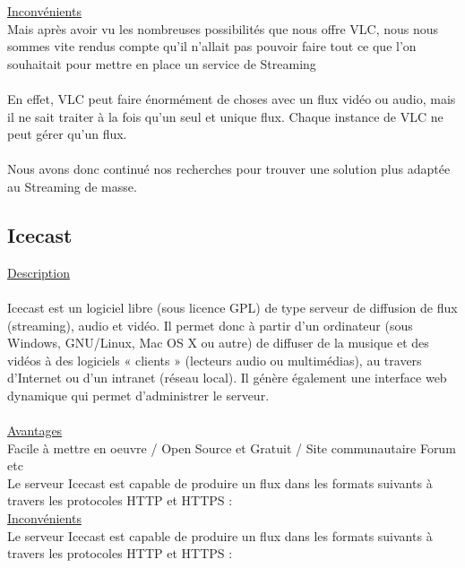 \documentclass{report}
\begin{document}
    \underline{Inconvénients}\\
    
    Mais après avoir vu les nombreuses possibilités que nous offre VLC, nous nous sommes vite rendus compte qu’il n’allait pas pouvoir faire tout ce que l’on souhaitait pour mettre en place un service de Streaming
    \\
    \\
    En effet, VLC peut faire énormément de choses avec un flux vidéo ou audio, mais il ne sait traiter à la fois qu’un seul et unique flux. Chaque instance de VLC ne peut gérer qu’un flux. 
    \\
    \\
    Nous avons donc continué nos recherches pour trouver une solution plus adaptée au Streaming de masse.


        \subsection{Icecast}
    
        
    \underline{Description}
    \\
    
    \\
    Icecast est un logiciel libre (sous licence GPL) de type serveur de diffusion de flux (streaming), audio et vidéo. Il permet donc à partir d'un ordinateur (sous Windows, GNU/Linux, Mac OS X ou autre) de diffuser de la musique et des vidéos à des logiciels « clients » (lecteurs audio ou multimédias), au travers d'Internet ou d'un intranet (réseau local). Il génère également une interface web dynamique qui permet d'administrer le serveur.
    \\
   
    \\
    \underline{Avantages}\\
    
    Facile à mettre en oeuvre / Open Source et Gratuit / Site communautaire Forum etc
     \\
     Le serveur Icecast est capable de produire un flux dans les formats suivants à travers les protocoles HTTP et HTTPS : 
    \\
    

  
    \underline{Inconvénients}\\
    
    Le serveur Icecast est capable de produire un flux dans les formats suivants à travers les protocoles HTTP et HTTPS : 
    \\
\end{document}
